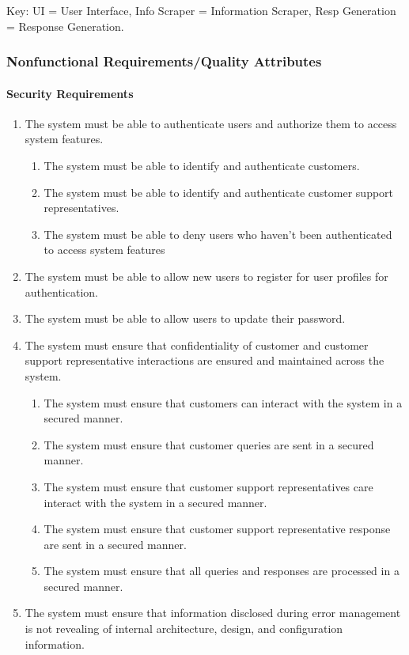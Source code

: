 \documentclass[11pt]{article}
\begin{document}
Key: UI = User Interface, Info Scraper = Information Scraper, Resp Generation =  Response Generation.

\subsubsection{Nonfunctional Requirements/Quality Attributes}

\paragraph{Security Requirements}
\begin{enumerate}[label=R1.\arabic*.]
	\item The system must be able to authenticate users and authorize them to access system features.
	\begin{enumerate}[label*=\arabic*.]
		\item The system must be able to identify and authenticate customers.
		\item The system must be able to identify and authenticate customer support representatives.
		\item The system must be able to deny users who haven't been authenticated to access system features
	\end{enumerate}
	\item The system must be able to allow new users to register for user profiles for authentication.
	\item The system must be able to allow users to update their password.
	\item The system must ensure that confidentiality of customer and customer support representative interactions are ensured and maintained across the system.
	\begin{enumerate}[label*=\arabic*.]
		\item The system must ensure that customers can interact with the system in a secured manner.
		\item The system must ensure that customer queries are sent in a secured manner.
		\item The system must ensure that customer support representatives care interact with the system in a secured manner.
		\item The system must ensure that customer support representative response are sent in a secured manner.
		\item The system must ensure that all queries and responses are processed in a secured manner.
	\end{enumerate}
	\item The system must ensure that information disclosed during error management is not revealing of internal architecture, design, and configuration information.
\end{enumerate}
\end{document}
